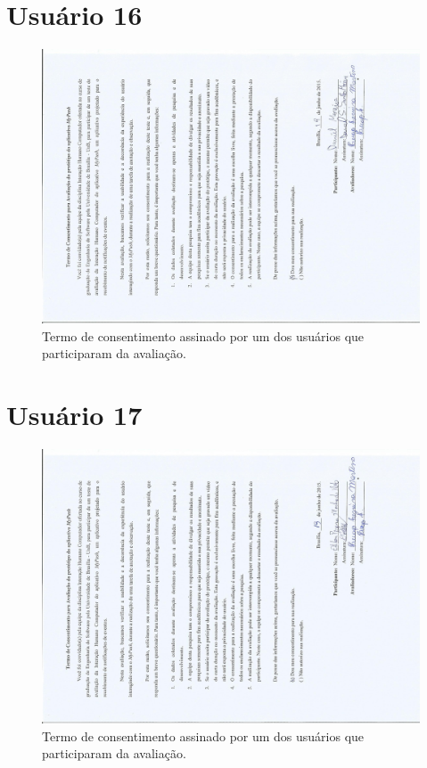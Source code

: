 \begin{anexosenv}
    \section*{Usuário 16}
    \begin{figure}[!htbp]
      \centering
      \includegraphics[scale=0.6, angle=-90]{editaveis/figuras/daniel}
      \caption{Termo de consentimento assinado por um dos usuários que participaram da avaliação.}
      \label{termo_consentimento_1}
    \end{figure}
    \pagebreak
    
    \section*{Usuário 17}
    \begin{figure}[!htbp]
      \centering
      \includegraphics[scale=0.6, angle=-90]{editaveis/figuras/odilon}
      \caption{Termo de consentimento assinado por um dos usuários que participaram da avaliação.}
      \label{termo_consentimento_1}
    \end{figure}
    \pagebreak
    

\end{anexosenv}
